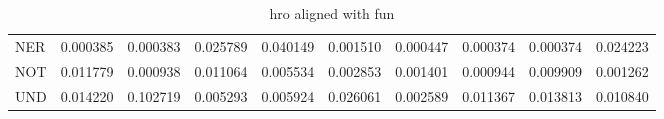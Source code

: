 \begin{table}[H]
\begin{center}
{\begin{tabular}{lrrrrrrrrr}
NER & {\cellcolor[HTML]{FFFFE5}} \color[HTML]{000000} 0.000385 & {\cellcolor[HTML]{FFFFE5}} \color[HTML]{000000} 0.000383 & {\cellcolor[HTML]{E3F4AA}} \color[HTML]{000000} 0.025789 & {\cellcolor[HTML]{BEE596}} \color[HTML]{000000} 0.040149 & {\cellcolor[HTML]{FEFFE2}} \color[HTML]{000000} 0.001510 & {\cellcolor[HTML]{FFFFE5}} \color[HTML]{000000} 0.000447 & {\cellcolor[HTML]{FFFFE5}} \color[HTML]{000000} 0.000374 & {\cellcolor[HTML]{FFFFE5}} \color[HTML]{000000} 0.000374 & {\cellcolor[HTML]{E6F5AC}} \color[HTML]{000000} 0.024223 \\
NOT & {\cellcolor[HTML]{F9FDC5}} \color[HTML]{000000} 0.011779 & {\cellcolor[HTML]{FFFFE4}} \color[HTML]{000000} 0.000938 & {\cellcolor[HTML]{F9FDC7}} \color[HTML]{000000} 0.011064 & {\cellcolor[HTML]{FCFED7}} \color[HTML]{000000} 0.005534 & {\cellcolor[HTML]{FEFFDE}} \color[HTML]{000000} 0.002853 & {\cellcolor[HTML]{FEFFE2}} \color[HTML]{000000} 0.001401 & {\cellcolor[HTML]{FFFFE4}} \color[HTML]{000000} 0.000944 & {\cellcolor[HTML]{FAFDC9}} \color[HTML]{000000} 0.009909 & {\cellcolor[HTML]{FFFFE4}} \color[HTML]{000000} 0.001262 \\
UND & {\cellcolor[HTML]{F8FCBD}} \color[HTML]{000000} 0.014220 & {\cellcolor[HTML]{0A703A}} \color[HTML]{F1F1F1} 0.102719 & {\cellcolor[HTML]{FCFED7}} \color[HTML]{000000} 0.005293 & {\cellcolor[HTML]{FCFED6}} \color[HTML]{000000} 0.005924 & {\cellcolor[HTML]{E3F4AA}} \color[HTML]{000000} 0.026061 & {\cellcolor[HTML]{FEFFDF}} \color[HTML]{000000} 0.002589 & {\cellcolor[HTML]{F9FDC5}} \color[HTML]{000000} 0.011367 & {\cellcolor[HTML]{F8FCBE}} \color[HTML]{000000} 0.013813 & {\cellcolor[HTML]{FAFDC8}} \color[HTML]{000000} 0.010840 \\
\bottomrule
\end{tabular}
}\end{center}
\caption{hro aligned with fun}\end{table}
